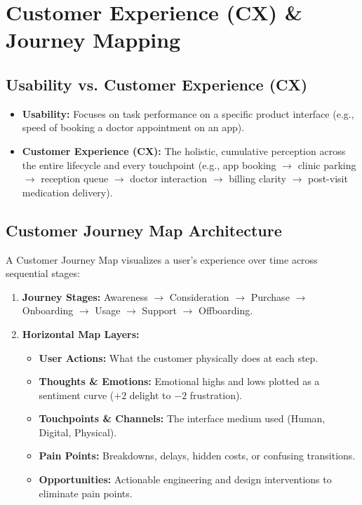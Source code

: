 \section{Customer Experience (CX) \& Journey Mapping}

\subsection{Usability vs. Customer Experience (CX)}
\begin{itemize}[leftmargin=1.2em, itemsep=3pt]
    \item \textbf{Usability:} Focuses on task performance on a specific product interface (e.g., speed of booking a doctor appointment on an app).
    \item \textbf{Customer Experience (CX):} The holistic, cumulative perception across the entire lifecycle and every touchpoint (e.g., app booking $\rightarrow$ clinic parking $\rightarrow$ reception queue $\rightarrow$ doctor interaction $\rightarrow$ billing clarity $\rightarrow$ post-visit medication delivery).
\end{itemize}

\subsection{Customer Journey Map Architecture}
A Customer Journey Map visualizes a user's experience over time across sequential stages:
\begin{enumerate}[leftmargin=1.2em, itemsep=3pt]
    \item \textbf{Journey Stages:} Awareness $\rightarrow$ Consideration $\rightarrow$ Purchase $\rightarrow$ Onboarding $\rightarrow$ Usage $\rightarrow$ Support $\rightarrow$ Offboarding.
    \item \textbf{Horizontal Map Layers:}
    \begin{itemize}
        \item \textbf{User Actions:} What the customer physically does at each step.
        \item \textbf{Thoughts \& Emotions:} Emotional highs and lows plotted as a sentiment curve ($+2$ delight to $-2$ frustration).
        \item \textbf{Touchpoints \& Channels:} The interface medium used (Human, Digital, Physical).
        \item \textbf{Pain Points:} Breakdowns, delays, hidden costs, or confusing transitions.
        \item \textbf{Opportunities:} Actionable engineering and design interventions to eliminate pain points.
    \end{itemize}
\end{enumerate}

